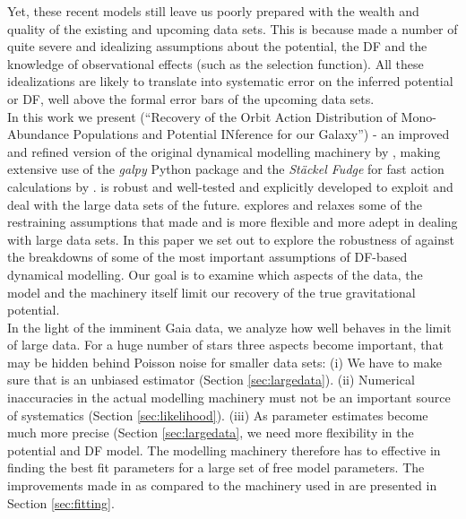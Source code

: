 Yet, these recent models still leave us poorly prepared with the wealth and quality of the existing and upcoming data sets. This is because \citet{2013ApJ...779..115B} made a number of quite severe and idealizing assumptions about the potential, the DF and the knowledge of observational effects (such as the selection function). All these idealizations are likely to translate into systematic error on the inferred potential or DF, well above the formal error bars of the upcoming data sets. \\

In this work we present \RM{} (``\textsc{R}ecovery of the \textsc{O}rbit \textsc{A}ction \textsc{D}istribution of \textsc{M}ono-\textsc{A}bundance \textsc{P}opulations and \textsc{P}otential \textsc{IN}ference for our \textsc{G}alaxy'') - an improved and refined version of the original dynamical modelling machinery by \citet{2013ApJ...779..115B}, making extensive use of the \emph{galpy} Python package \citep{2015ApJS..216...29B} and the \emph{St\"{a}ckel Fudge} for fast action calculations by \cite{2012MNRAS.426.1324B}. \RM{} is robust and well-tested and explicitly developed to exploit and deal with the large data sets of the future. \RM{} explores and relaxes some of the restraining assumptions that \citet{2013ApJ...779..115B} made and is more flexible and more adept in dealing with large data sets. In this paper we set out to explore the robustness of \RM{} against the breakdowns of some of the most important assumptions of DF-based dynamical modelling. Our goal is to examine which aspects of the data, the model and the machinery itself limit our recovery of the true gravitational potential.\\

In the light of the imminent Gaia data, we analyze how well \RM{} behaves in the limit of large data. For a huge number of stars three aspects become important, that may be hidden behind Poisson noise for smaller data sets: (i) We have to make sure that \RM{} is an unbiased estimator (Section \ref{sec:largedata}). (ii) Numerical inaccuracies in the actual modelling machinery must not be an important source of systematics (Section \ref{sec:likelihood}). (iii) As parameter estimates become much more precise (Section \ref{sec:largedata}, we need more flexibility in the potential and DF model. The modelling machinery therefore has to effective in finding the best fit parameters for a large set of free model parameters. The improvements made in \RM{} as compared to the machinery used in \citet{2013ApJ...779..115B} are presented in Section \ref{sec:fitting}.\\

